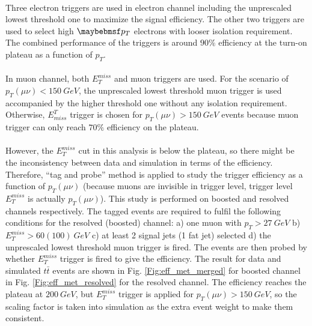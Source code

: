 \noindent
\\Three electron triggers are used in electron channel including the unprescaled lowest threshold one to maximize the signal efficiency. The other two triggers are used to select high $\p_{T}$ electrons with looser isolation requirement. The combined performance of the triggers is around $90\%$ efficiency at the turn-on plateau as a function of $p_{T}$.
\\
\\In muon channel, both $E_{T}^{miss}$ and muon triggers are used. For the scenario of $p_{T}(\mu\nu)<150~GeV$, the unprescaled lowest threshold muon trigger is used accompanied by the higher threshold one without any isolation requirement. Otherwise, $E^{T}_{miss}$ trigger is chosen for $p_{T}(\mu\nu)>150~GeV$ events because muon trigger can only reach $70\%$ efficiency on the plateau.
\\
\\However, the $E^{miss}_{T}$ cut in this analysis is below the plateau, so there might be the inconsistency between data and simulation in terms of the efficiency. Therefore, ``tag and probe'' method is applied to study the trigger efficiency as a function of $p_{T}(\mu\nu)$ (because muons are invisible in trigger level, trigger level $E_{T}^{miss}$ is actually $p_{T}(\mu\nu)$). This study is performed on boosted and resolved channels respectively. The tagged events are required to fulfil the following conditions for the resolved (boosted) channel: a) one muon with $p_{T}>27~GeV$ b) $E^{miss}_{T}>60(100)~GeV$ c) at least 2 signal jets (1 fat jet) selected d) the unprescaled lowest threshold muon trigger is fired. The events are then probed by whether $E^{miss}_{T}$ trigger is fired to give the efficiency. The result for data and simulated $t\bar{t}$ events are shown in Fig. \ref{Fig:eff_met_merged} for boosted channel in Fig. \ref{Fig:eff_met_resolved} for the resolved channel. The efficiency reaches the plateau at $200~GeV$, but $E^{miss}_{T}$ trigger is applied for $p_{T}(\mu\nu)>150~GeV$, so the scaling factor is taken into simulation as the extra event weight to make them consistent. 
